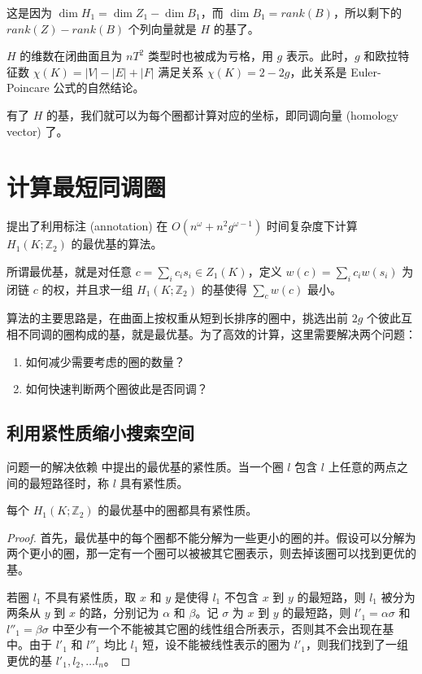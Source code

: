 这是因为 $ \dim H_1 = \dim Z_1 - \dim B_1 $，而 $ \dim B_1 = rank(B) $，所以剩下的 $ rank(Z) - rank(B) $ 个列向量就是 $ H $ 的基了。

$ H $ 的维数在闭曲面且为 $ nT^2 $ 类型时也被成为亏格，用 $ g $ 表示。此时，$ g $ 和欧拉特征数 $ \chi(K) = |V| - |E| + |F| $ 满足关系 $ \chi(K) = 2 - 2g $，此关系是 Euler-Poincare 公式的自然结论。

有了 $ H $ 的基，我们就可以为每个圈都计算对应的坐标，即同调向量 (homology vector) 了。

\section{计算最短同调圈}
\label{sec:shortest-h1m}

\citet{Busaryev2012} 提出了利用标注 (annotation) 在 $ O(n^\omega + n^2 g^{\omega - 1}) $ 时间复杂度下计算 $ H_1(K; \mathbb{Z}_2) $ 的最优基的算法。

所谓最优基，就是对任意 $ c = \sum_i c_i s_i \in Z_1(K) $，定义 $ w(c) = \sum_i c_i w(s_i) $ 为闭链 $ c $ 的权，并且求一组 $ H_1(K; \mathbb{Z}_2) $ 的基使得 $ \sum_{c} w(c) $ 最小。

算法的主要思路是，在曲面上按权重从短到长排序的圈中，挑选出前 $ 2g $ 个彼此互相不同调的圈构成的基，就是最优基。为了高效的计算，这里需要解决两个问题：
\begin{enumerate}
    \item 如何减少需要考虑的圈的数量？
    \item 如何快速判断两个圈彼此是否同调？
\end{enumerate}

\subsection{利用紧性质缩小搜索空间}

问题一的解决依赖 \citet{Erickson2005} 中提出的最优基的紧性质。当一个圈 $ l $ 包含 $ l $ 上任意的两点之间的最短路径时，称 $ l $ 具有紧性质。

\begin{proposition}
    每个 $ H_1(K; \mathbb{Z}_2) $ 的最优基中的圈都具有紧性质。
\end{proposition}
\begin{proof}
    首先，最优基中的每个圈都不能分解为一些更小的圈的并。假设可以分解为两个更小的圈，那一定有一个圈可以被被其它圈表示，则去掉该圈可以找到更优的基。

    若圈 $ l_1 $ 不具有紧性质，取 $ x $ 和 $ y $ 是使得 $ l_1 $ 不包含 $ x $ 到 $ y $ 的最短路，则 $ l_1 $ 被分为两条从 $ y $ 到 $ x $ 的路，分别记为 $ \alpha $ 和 $ \beta $。记 $ \sigma $ 为 $ x $ 到 $ y $ 的最短路，则 $ l'_1 = \alpha \sigma $ 和 $ l''_1 = \beta \sigma $ 中至少有一个不能被其它圈的线性组合所表示，否则其不会出现在基中。由于 $ l'_1 $ 和 $ l''_1 $ 均比 $ l_1 $ 短，设不能被线性表示的圈为 $ l'_1 $，则我们找到了一组更优的基 $ l'_1, l_2, \dots l_{n} $。
\end{proof}

